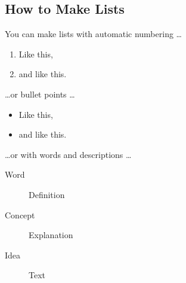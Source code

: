 \documentclass[a4paper]{article}
\begin{document}
\subsection{How to Make Lists}

You can make lists with automatic numbering \dots

\begin{enumerate}
    \item Like this,
    \item and like this.
\end{enumerate}
\dots or bullet points \dots
\begin{itemize}
    \item Like this,
    \item and like this.
\end{itemize}
\dots or with words and descriptions \dots
\begin{description}
    \item[Word] Definition
    \item[Concept] Explanation
    \item[Idea] Text
\end{description}
\end{document}

